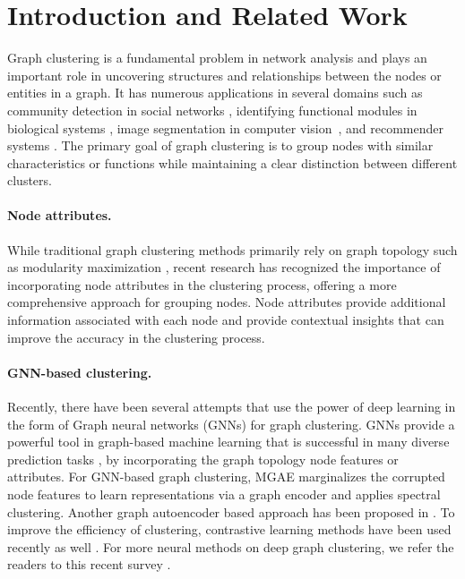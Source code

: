 \section{Introduction and Related Work}

Graph clustering is a fundamental problem in network analysis and plays an important role in uncovering structures and relationships between the nodes or entities in a graph. It has numerous applications in several domains such as community detection in social networks \cite{newman2006finding}, identifying functional modules in biological systems \cite{wang2010fast}, image segmentation in computer vision~\cite{felzenszwalb2004efficient}, and recommender systems \cite{moradi2015effective}. The primary goal of graph clustering is to group nodes with similar characteristics or functions while maintaining a clear distinction between different clusters. 



 \paragraph{Node attributes. }While traditional graph clustering methods primarily rely on graph topology such as modularity maximization \cite{newman2006modularity,newman2003mixing}, recent research \cite{wang2017mgae} has recognized the importance of incorporating node attributes in the clustering process, offering a more comprehensive approach for grouping nodes. Node attributes provide additional information associated with each node and provide contextual insights that can improve the accuracy in the clustering process. %

 \paragraph{GNN-based clustering. }Recently, there have been several attempts that use the power of deep learning in the form of Graph neural networks (GNNs) \cite{kipf2016semi, hamilton2017inductive, velickovic2017graph} for graph clustering. GNNs provide a powerful tool in graph-based machine learning that is successful in many diverse prediction tasks \cite{zhang2018link,ying2018hierarchical,ying2018graph},
by incorporating the graph topology node features or attributes. For GNN-based graph clustering, MGAE \cite{wang2017mgae} marginalizes the corrupted node features to learn representations via a graph encoder and applies spectral clustering. Another graph autoencoder based approach has been proposed in \cite{park2019symmetric}. To improve the efficiency of clustering, contrastive learning methods have been used recently as well \cite{liu2023simple,kulatilleke2022scgc,xia2021self}. For more neural methods on deep graph clustering, we refer the readers to this recent survey \cite{yue2022survey}. %










